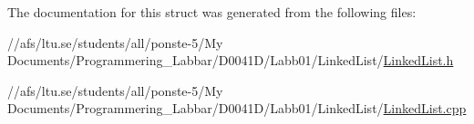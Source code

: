 The documentation for this struct was generated from the following files\-:\begin{DoxyCompactItemize}
\item 
//afs/ltu.\-se/students/all/ponste-\/5/\-My Documents/\-Programmering\-\_\-\-Labbar/\-D0041\-D/\-Labb01/\-Linked\-List/\hyperlink{_linked_list_8h}{Linked\-List.\-h}\item 
//afs/ltu.\-se/students/all/ponste-\/5/\-My Documents/\-Programmering\-\_\-\-Labbar/\-D0041\-D/\-Labb01/\-Linked\-List/\hyperlink{_linked_list_8cpp}{Linked\-List.\-cpp}\end{DoxyCompactItemize}
